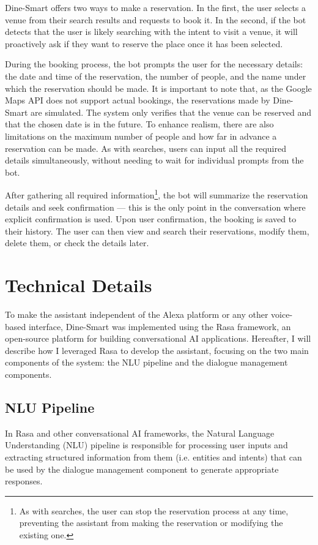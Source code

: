 \documentclass[twocolumn]{article}
\begin{document}
Dine-Smart offers two ways to make a reservation. In the first, the user selects a venue from their search results and requests to book it. In the second, if the bot detects that the user is likely searching with the intent to visit a venue, it will proactively ask if they want to reserve the place once it has been selected.

During the booking process, the bot prompts the user for the necessary details: the date and time of the reservation, the number of people, and the name under which the reservation should be made. It is important to note that, as the Google Maps API does not support actual bookings, the reservations made by Dine-Smart are simulated. The system only verifies that the venue can be reserved and that the chosen date is in the future. To enhance realism, there are also limitations on the maximum number of people and how far in advance a reservation can be made. As with searches, users can input all the required details simultaneously, without needing to wait for individual prompts from the bot.

After gathering all required information\footnote{As with searches, the user can stop the reservation process at any time, preventing the assistant from making the reservation or modifying the existing one.}, the bot will summarize the reservation details and seek confirmation — this is the only point in the conversation where explicit confirmation is used. Upon user confirmation, the booking is saved to their history. The user can then view and search their reservations, modify them, delete them, or check the details later.

\section{Technical Details}

To make the assistant independent of the Alexa platform or any other voice-based interface, Dine-Smart was implemented using the Rasa framework, an open-source platform for building conversational AI applications. Hereafter, I will describe how I leveraged Rasa to develop the assistant, focusing on the two main components of the system: the NLU pipeline and the dialogue management components.

\subsection{NLU Pipeline}

In Rasa and other conversational AI frameworks, the Natural Language Understanding (NLU) pipeline is responsible for processing user inputs and extracting structured information from them (i.e. entities and intents) that can be used by the dialogue management component to generate appropriate responses.
\end{document}
